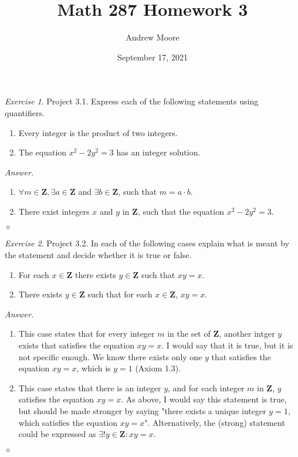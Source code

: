 \documentclass[12pt,oneside]{amsart}
\title{Math 287 Homework 3}
\author{Andrew Moore}
\date{September 17, 2021} %
\theoremstyle{remark}
\newtheorem{exer}{Exercise}
\newcommand{\bfZ}{\mathbf{Z}}
\newenvironment{answer}{\bigskip\noindent\emph{Answer.}}{\hfill$\diamond$\newline}
\begin{document}
\maketitle

%
%
%
%

\newpage
\begin{exer}
Project 3.1. Express each of the following statements using quantifiers.
\begin{enumerate}[label={(\roman*)},start={3}]
\item Every integer is the product of two integers.
\item The equation $x^2-2y^2 = 3$ has an integer solution.
\end{enumerate}
\end{exer}

\begin{answer}
\begin{enumerate}[label={(\roman*)},start={3}]
\item $\forall m \in \bfZ, \exists a \in \bfZ$ and $\exists b \in \bfZ$, such that $m = a \cdot b$.
\item There exist integers $x$ and $y$ in $\bfZ$, such that the equation $x^2 - 2y^2 = 3$.
\end{enumerate}
\end{answer}

%
%
%
%

\newpage
\begin{exer}
Project 3.2. In each of the following cases explain what is meant by the statement and decide whether it is true or false.
\begin{enumerate}[label={(\roman*)},start={3}]
\item For each $x \in \mathbf{Z}$ there exists $y \in \mathbf{Z}$ such that $xy=x$.
\item There exists $y \in \mathbf{Z}$ such that for each $x \in \mathbf{Z}$, $xy=x$.
\end{enumerate}
\end{exer}

\begin{answer}
\begin{enumerate}[label={(\roman*)},start={3}]
\item This case states that for every integer $m$ in the set of $\bfZ$, another intger $y$ exists that satisfies the equation $xy = x$. I would say that it is true, but it is not specific enough. We know there exists only one $y$ that satisfies the equation $xy = x$, which is $y = 1$ (Axiom 1.3).
\item This case states that there is an integer $y$, and for each integer $m$ in $\bfZ$, $y$ satisfies the equation $xy = x$. As above, I would say this statement is true, but should be made stronger by saying "there exists a unique integer $y = 1$, which satisfies the equation $xy = x$". Alternatively, the (strong) statement could be expressed as $\exists!y \in \bfZ \colon xy = x$.
\end{enumerate}
\end{answer}
\end{document}
